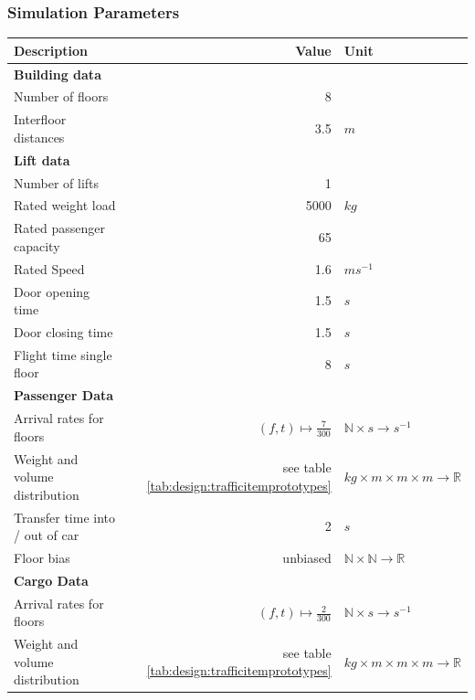 \subsubsection{Simulation Parameters}

\begin{table}[]
\centering
\begin{tabular}{lrl}
\textbf{Description} \hspace{4cm}   & \textbf{Value}   & \textbf{Unit}   \\
\hline
\multicolumn{3}{l}{\textbf{Building data}} \\
Number of floors & 8 &        \\
Interfloor distances & 3.5 & $m$\\
\hline
\multicolumn{3}{l}{\textbf{Lift data}}     \\
Number of lifts & 1 & \\
Rated weight load & 5000 & $kg$\\
Rated passenger capacity & 65 & \\
Rated Speed & 1.6 & $ms^{-1}$ \\
Door opening time & 1.5 & $s$\\
Door closing time & 1.5 & $s$\\
Flight time single floor & 8 & $s$\\
\hline
\multicolumn{3}{l}{\textbf{Passenger Data}}\\
Arrival rates for floors & $ (f, t) \mapsto \frac{7}{300} $ & $ \mathbb{N} \times s \rightarrow s^{-1}$\\
Weight and volume distribution & see table \ref{tab:design:trafficitemprototypes} & $kg \times m \times m \times m \rightarrow \mathbb{R}$\\
Transfer time into / out of car & 2 & $s$\\
Floor bias & unbiased & $ \mathbb{N} \times \mathbb{N} \rightarrow \mathbb{R} $ \\
\hline
\multicolumn{3}{l}{\textbf{Cargo Data}}\\
Arrival rates for floors & $ (f, t) \mapsto \frac{2}{300} $ & $\mathbb{N} \times s \rightarrow s^{-1}$\\
Weight and volume distribution & see table \ref{tab:design:trafficitemprototypes} & $kg \times m \times m \times m \rightarrow \mathbb{R}$\\

\end{tabular}
\end{table}
